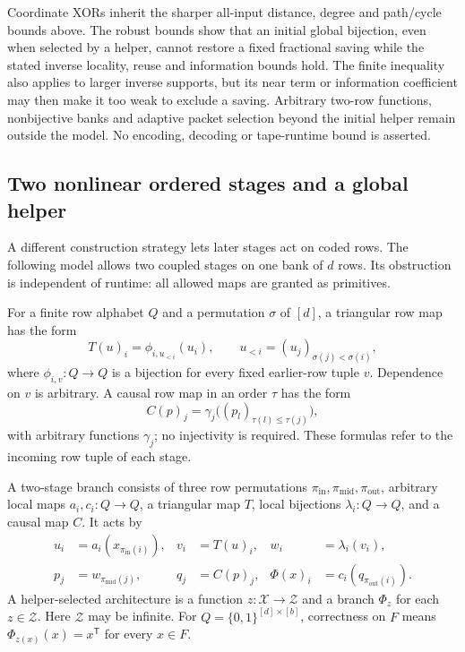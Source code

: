 Coordinate XORs inherit the sharper all-input distance, degree and path/cycle
bounds above. The robust bounds show that an initial global bijection, even
when selected by a helper, cannot restore a fixed fractional saving while
the stated inverse locality, reuse and information bounds hold.
The finite inequality also applies to larger inverse supports, but its near
term or information coefficient may then make it too weak to exclude a
saving. Arbitrary two-row functions, nonbijective banks and adaptive packet
selection beyond the initial helper remain outside the model. No encoding,
decoding or tape-runtime bound is asserted.

\subsection{Two nonlinear ordered stages and a global helper}\label{subsec:local-two-stage}

A different construction strategy lets later stages act on coded rows.
The following model allows two coupled stages on one bank of $d$ rows.
Its obstruction is independent of runtime: all allowed maps are granted as
primitives.

\begin{definition}\label{def:local-triangular-causal}
For a finite row alphabet $Q$ and a permutation $\sigma$ of $[d]$, a triangular
row map has the form
\[
  T(u)_i=\phi_{i,u_{<i}}(u_i),\qquad
  u_{<i}=(u_j)_{\sigma(j)<\sigma(i)},
\]
where $\phi_{i,v}:Q\to Q$ is a bijection for every fixed earlier-row tuple
$v$.  Dependence on $v$ is arbitrary.  A causal row map in an order $\tau$ has
the form
\[
  C(p)_j=\gamma_j\bigl((p_l)_{\tau(l)\le\tau(j)}\bigr),
\]
with arbitrary functions $\gamma_j$; no injectivity is required.
These formulas refer to the incoming row tuple of each stage.
\end{definition}

\begin{definition}\label{def:local-two-stage}
A two-stage branch consists of three row permutations
$\pi_{\mathrm{in}},\pi_{\mathrm{mid}},\pi_{\mathrm{out}}$, arbitrary local
maps $a_i,c_i:Q\to Q$, a triangular map $T$, local bijections
$\lambda_i:Q\to Q$, and a causal map $C$.  It acts by
\begin{align*}
 u_i&=a_i(x_{\pi_{\mathrm{in}}(i)}),&
 v_i&=T(u)_i,& w_i&=\lambda_i(v_i),\\
 p_j&=w_{\pi_{\mathrm{mid}}(j)},&
 q_j&=C(p)_j,& \Phi(x)_i&=c_i(q_{\pi_{\mathrm{out}}(i)}).
\end{align*}
A helper-selected architecture is a function $z:\mathcal X\to\mathcal Z$
and a branch $\Phi_z$ for each $z\in\mathcal Z$.  Here $\mathcal Z$ may be
infinite.  For $Q=\{0,1\}^{[d]\times[b]}$, correctness on $F$ means
$\Phi_{z(x)}(x)=x^{\mathsf T}$ for every $x\in F$.
\end{definition}

